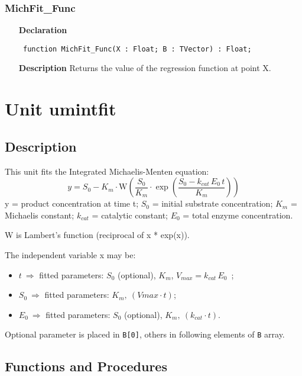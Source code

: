 \documentclass[12pt,a4paper,oneside]{report}
\newcommand{\declarationitem}[1]{\textbf{#1}}
\newcommand{\descriptiontitle}[1]{\textbf{#1}}
\newcommand{\code}[1]{\texttt{#1}}
\begin{document}
\subsubsection{MichFit{\_}Func}
\label{umichfit-MichFit_Func}
\begin{itemize}\item[\declarationitem{Declaration}\hfill]
	\begin{flushleft}
		\code{
			function MichFit{\_}Func(X : Float; B : TVector) : Float;}
		
	\end{flushleft}
	
	\par
	\item[\descriptiontitle{Description}]
	Returns the value of the regression function at point X.
	
\end{itemize}
\section{Unit umintfit}
\label{umintfit}
\subsection{Description}
This unit fits the Integrated Michaelis{-}Menten equation:
$$
y=S_0-K_m \cdot \textrm{W}\left(\frac{S_0}{K_m}\cdot \exp\left(\frac{S_0-k_{cat}\,E_0\,t}{K_m}\right)\right)
$$
y = product concentration at time t; $S_0$ = initial substrate concentration; $K_m$ = Michaelis constant; $k_{cat}$ = catalytic constant; $E_0$ = total enzyme concentration.

W is Lambert's function (reciprocal of x * exp(x)).

The independent variable x may be:
\begin{itemize}
	\item $t\ \Longrightarrow$ fitted parameters: $S_0$ (optional), $K_m$, $V_{max} = k_{cat}\,E_0$\ ;
	\item $S_0\ \Longrightarrow$ fitted parameters: $K_m,\ (V{max}\cdot t)$;
	\item $E_0\ \Longrightarrow$ fitted parameters: $S_0$ (optional), $K_m,\ (k_{cat}\cdot t)$.
\end{itemize}
Optional parameter is placed in \code{B[0]}, others in following elements of \code{B} array.
\subsection{Functions and Procedures}
\end{document}

